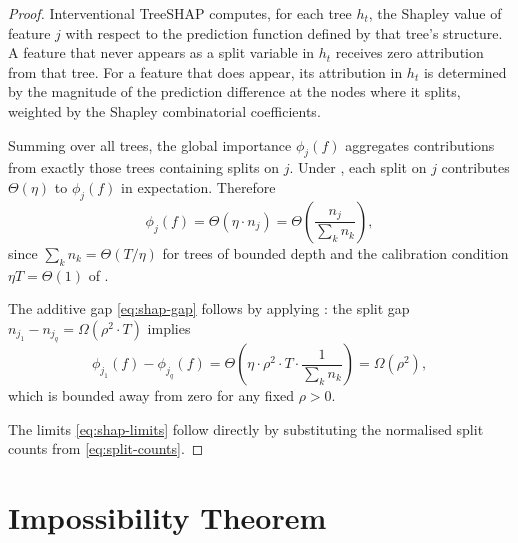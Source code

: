 \documentclass[11pt]{article}
\theoremstyle{remark}
\newcommand{\phij}{\phi_j}                  %
\newcommand{\splits}[1]{n_{#1}}             %
\newcommand{\totalT}{T}                     %
\newcommand{\rhovar}{\rho}                  %
\begin{document}
\begin{proof}
Interventional TreeSHAP computes, for each tree $h_t$, the Shapley value
of feature $j$ with respect to the prediction function defined by that
tree's structure.  A feature that never appears as a split variable in
$h_t$ receives zero attribution from that tree.  For a feature that does
appear, its attribution in $h_t$ is determined by the magnitude of the
prediction difference at the nodes where it splits, weighted by the
Shapley combinatorial coefficients.

Summing over all trees, the global importance $\phij(f)$ aggregates
contributions from exactly those trees containing splits on $j$.
Under , each split on $j$ contributes
$\Theta(\eta)$ to $\phij(f)$ in expectation.
Therefore
\begin{equation}
  \phij(f)
    = \Theta(\eta \cdot \splits{j})
    = \Theta\!\left(\frac{\splits{j}}{\sum_k \splits{k}}\right),
\end{equation}
since $\sum_k \splits{k} = \Theta(\totalT/\eta)$ for trees of bounded
depth and the calibration condition $\eta T = \Theta(1)$ of .

The additive gap \eqref{eq:shap-gap} follows by applying
: the split gap
$\splits{j_1} - \splits{j_q} = \Omega(\rhovar^2 \cdot \totalT)$ implies
\begin{equation}
  \phi_{j_1}(f) - \phi_{j_q}(f)
    = \Theta\!\left(\eta \cdot \rhovar^2 \cdot \totalT
      \cdot \frac{1}{\sum_k n_k}\right)
    = \Omega(\rhovar^2),
\end{equation}
which is bounded away from zero for any fixed $\rhovar > 0$.

The limits \eqref{eq:shap-limits} follow directly by substituting the
normalised split counts from \eqref{eq:split-counts}.
\end{proof}


\section{Impossibility Theorem}
\label{sec:impossibility}
\end{document}
